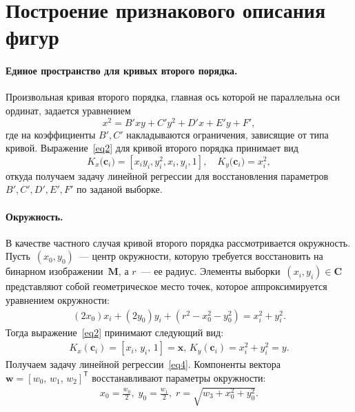 \documentclass[12pt]{a&t}
\begin{document}
\section{Построение признакового описания фигур}
\paragraph{Единое пространство для кривых второго порядка.} Произвольная кривая второго порядка, главная ось которой не параллельна оси ординат, задается  уравнением
\[
\label{st:coef}
x^2 = B'xy+C'y^2+D'x+E'y+F',
\]
где на коэффициенты $B', C'$ накладываются ограничения, зависящие от типа кривой. Выражение~\eqref{eq2} для кривой второго порядка принимает вид
\[
\label{st:K_map}
K_x\bigr(\mathbf{c}_i\bigr)=\left[x_iy_i, y_i^2, x_i, y_i, 1\right], \quad K_y\bigr(\mathbf{c}_i\bigr)=x_i^2,
\]
откуда получаем задачу линейной регрессии для восстановления параметров ~$B', C', D', E', F'$ по заданой выборке.

\paragraph{Окружность.} В качестве частного случая кривой второго порядка рассмотривается окружность.
Пусть~$(x_0, y_0)$~--- центр окружности, которую требуется восстановить на бинарном изображении~$\mathbf{M}$, а $r$~--- ее радиус.
Элементы выборки~$(x_i, y_i) \in \mathbf{C}$ представляют собой геометрическое место точек, которое аппроксимируется уравнением окружности:
\begin{gather}(2x_0) x_i + (2y_0) y_i + (r^2 - x_0^2 - y_0^2) = x_i^2 + y_i^2. 
\end{gather}
Тогда выражение~\eqref{eq2} принимают следующий вид:
\begin{gather}
\label{10}
K_{x}(\mathbf{c}_i) = [x_i, \, y_i, \, 1] = \mathbf{x}, \,  K_{y}(\mathbf{c}_i) = x_i^2+y_i^2 = y.
\end{gather} 
Получаем задачу линейной регрессии~\eqref{eq4}.
Компоненты вектора~$\mathbf{w} = [w_0, \, w_1, \, w_2]^\mathsf{T}$ восстанавливают параметры окружности:
\begin{gather}
x_0 = \frac{w_0}{2}, \; y_0 = \frac{w_1}{2}, \; r = \sqrt{w_3 + x_0^2 + y_0 ^2}.
\end{gather}
\end{document}
